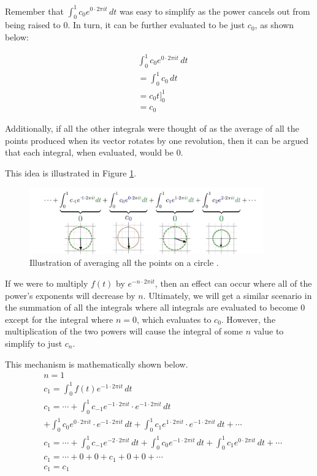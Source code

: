 \documentclass[letterpaper, 12pt]{article}
\begin{document}
Remember that \(\int_{0}^{1} c_{0} e^{0 \cdot 2\pi it} \,dt\) was easy to simplify
as the power cancels out from being raised to 0. In turn, it can be further
evaluated to be just \(c_0\), as shown below:

\begin{align*}
     & \int_{0}^{1} c_{0} e^{0 \cdot 2\pi it} \,dt
    \\
     & = \int_{0}^{1} c_{0} \,dt
    \\
     & = c_{0}t]_{0}^1
    \\
     & = c_{0}
\end{align*}

Additionally, if all the other integrals were thought of as the average of all
the points produced when its vector rotates by one revolution, then it can
be argued that each integral, when evaluated, would be 0.

This idea is illustrated in Figure \ref*{fig:circle_integ}.

\begin{figure}[H]
    \centering
    \includegraphics[width=0.9\textwidth]{circle_integ.jpeg}
    \caption{Illustration of averaging all the points on a circle \protect\cite{sandersonWhatFourierSeries2019}.}
    \label{fig:circle_integ}
\end{figure}

If we were to multiply \(f(t)\) by \(e^{-n \cdot 2\pi it}\), then an effect can occur
where all of the power's exponents will decrease by \(n\). Ultimately, we will
get a similar scenario in the summation of all the integrals where
all integrals are evaluated to become 0 except for the integral
where \(n = 0\), which evaluates to \(c_0\). However, the multiplication
of the two powers will cause the integral of some \(n\) value to simplify to just
\(c_n\).

This mechanism is mathematically shown below.
\begin{align*}
     & n = 1
    \\
     & c_1 = \int_{0}^{1} f(t) e^{-1 \cdot 2\pi it} \,dt
    \\
     & c_1 = \cdots + \int_{0}^{1} c_{-1} e^{-1 \cdot 2\pi it} \cdot e^{-1 \cdot 2\pi it} \,dt
    \\
     & + \int_{0}^{1} c_{0} e^{0 \cdot 2\pi it} \cdot e^{-1 \cdot 2\pi it} \,dt + \int_{0}^{1} c_{1} e^{1 \cdot 2\pi it} \cdot e^{-1 \cdot 2\pi it} \,dt + \cdots
    \\
     & c_1 = \cdots + \int_{0}^{1} c_{-1} e^{-2 \cdot 2\pi it} \,dt + \int_{0}^{1} c_{0} e^{-1 \cdot 2\pi it} \,dt + \int_{0}^{1} c_{1} e^{0 \cdot 2\pi it} \,dt + \cdots
    \\
     & c_1 = \cdots + 0 + 0 + c_1 + 0 + 0 + \cdots
    \\
     & c_1 = c_1
\end{align*}
\end{document}
